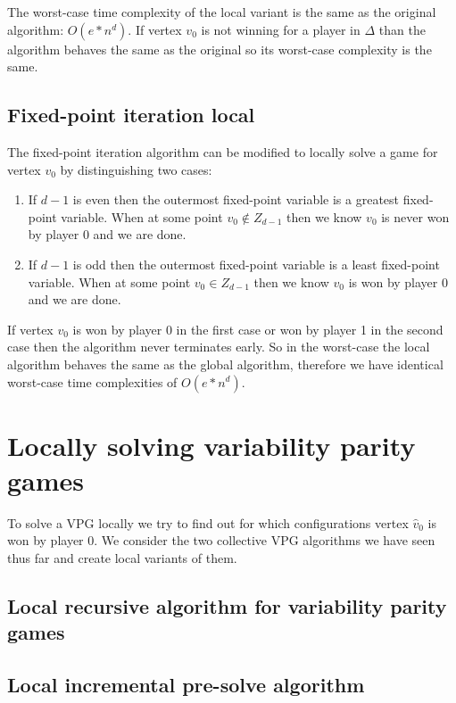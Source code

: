 The worst-case time complexity of the local variant is the same as the original algorithm: $O(e*n^d)$. If vertex $v_0$ is not winning for a player in $\Delta$ than the algorithm behaves the same as the original so its worst-case complexity is the same.


\subsection{Fixed-point iteration local}
The fixed-point iteration algorithm can be modified to locally solve a game for vertex $v_0$ by distinguishing two cases:
\begin{enumerate}
	\item If $d-1$ is even then the outermost fixed-point variable is a greatest fixed-point variable. When at some point $v_0 \notin Z_{d-1}$ then we know $v_0$ is never won by player $0$ and we are done.
	\item If $d-1$ is odd then the outermost fixed-point variable is a least fixed-point variable. When at some point $v_0 \in Z_{d-1}$ then we know $v_0$ is won by player $0$ and we are done.
\end{enumerate}

If vertex $v_0$ is won by player 0 in the first case or won by player 1 in the second case then the algorithm never terminates early. So in the worst-case the local algorithm behaves the same as the global algorithm, therefore we have identical worst-case time complexities of $O(e*n^d)$.

\section{Locally solving variability parity games}
To solve a VPG locally we try to find out for which configurations vertex $\hat{v}_0$ is won by player $0$. We consider the two collective VPG algorithms we have seen thus far and create local variants of them.
\subsection{Local recursive algorithm for variability parity games}


\subsection{Local incremental pre-solve algorithm}
